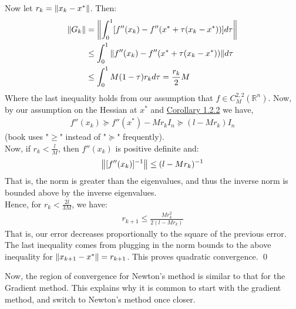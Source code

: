 \documentclass[12pt,a4paper]{article}
\begin{document}
	 Now let $r_k = \norm{x_k - x^*}$. Then:
	 \begin{align*}
	 	\norm{G_k} &= \norm{\int_{0}^{1}[f''(x_k) - f''(x^* + \tau(x_k - x^*))]d\tau} \\
	 	&\leq \int_{0}^{1}\norm{f''(x_k) - f''(x^* + \tau(x_k - x^*))}d\tau \\
	 	&\leq \int_{0}^{1}M(1-\tau)r_kd\tau = \frac{r_k}{2}M
	 \end{align*}
	 Where the last inequality holds from our assumption that $f \in C_M^{2,2}(\mathbb{R}^n)$.
	 Now, by our assumption on the Hessian at $x^*$ and \hyperref[cor122]{Corollary 1.2.2} we have,
	 \begin{align*}
	 	f''(x_k) \succeq f''(x^*) - Mr_kI_n \succeq (l-Mr_k)I_n
	 \end{align*}
	 (book uses "$\geq$" instead of "$\succeq$" frequently).\\
	 Now, if $r_k < \frac{l}{M}$, then $f''(x_k)$ is positive definite and:
	 \begin{align*}
	 	\norm{[f''(x_k)]^{-1}} \leq (l - Mr_k)^{-1}
	 \end{align*}
	 That is, the norm is greater than the eigenvalues, and thus the inverse norm is bounded above by the inverse eigenvalues. \\
	 Hence, for $r_k < \frac{2l}{3M}$, we have:
	 \begin{align*}
	 	r_{k+1} \leq \frac{Mr_k^2}{2(l - Mr_k)}
	 \end{align*}
	 That is, our error decreases proportionally to the square of the previous error. The last inequality comes from plugging in the norm bounds to the above inequality for $\norm{x_{k+1} - x^*} = r_{k+1}$. This proves quadratic convergence. \qed
	 
	 Now, the region of convergence for Newton's method is similar to that for the Gradient method. This explains why it is common to start with the gradient method, and switch to Newton's method once closer. 
	 
\end{document}
